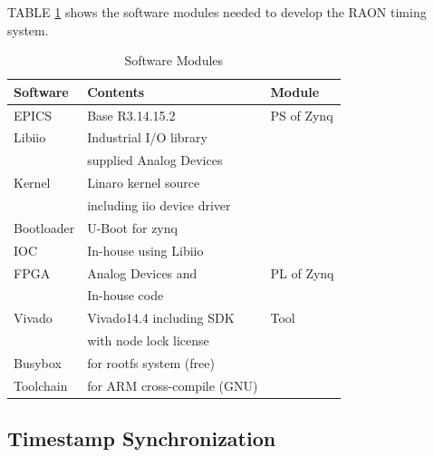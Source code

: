 \documentclass[journal,reqno]{IEEEtran}
\begin{document}
TABLE \ref{sw-conf} shows the software modules needed to develop the RAON timing system.

\begin{table}[h!t]
	\centering
	\caption{Software Modules}
	\label{sw-conf}
	\begin{tabular}{@{}lll@{}}
		\hline
		\textbf{Software} & \textbf{Contents}                 & \textbf{Module}     \\
		\hline
		EPICS        & Base R3.14.15.2                       & PS of Zynq            \\
		Libiio       & Industrial I/O library                &                       \\
		& supplied Analog Devices               &                       \\         
		Kernel       & Linaro kernel source                  &                       \\
		& including iio device driver           &                       \\         
		Bootloader   & U-Boot for zynq                       &                       \\
		IOC          & In-house using Libiio                 &                       \\
		
		\hline
		FPGA         & Analog Devices and                    & PL of Zynq            \\
		& In-house code                         &                       \\
		
		\hline
		Vivado       & Vivado14.4 including SDK              & Tool                  \\        
		& with node lock license                &                       \\            
		Busybox      & for rootfs system (free)              &                       \\
		Toolchain    & for ARM cross-compile (GNU)           &                       \\        
		\hline
	\end{tabular}
\end{table}

\subsection{Timestamp Synchronization}
\end{document}
